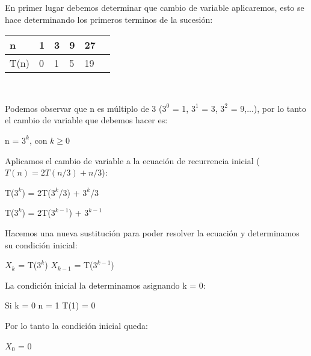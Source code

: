 \begin{solution}
  En primer lugar debemos determinar que cambio de variable aplicaremos, esto se hace determinando los primeros terminos de la sucesión:
  \begin{center}
    \begin{tabular}{@{}llllll@{}}
        \toprule
        n & 1 & 3 & 9 & 27 \\ \midrule
        T(n) & 0 & 1 & 5 & 19 \\ 
        \bottomrule
    \end{tabular}\\
  \end{center}
  
  Podemos observar que n es múltiplo de 3 ($3^0$ = 1, $3^1$ = 3, $3^2$ = 9,...), por lo tanto el cambio de variable que debemos hacer es:
  \begin{center}
      n = $3^k$, con $k \ge 0$
  \end{center}
  
  Aplicamos el cambio de variable a la ecuación de recurrencia inicial ($T(n) = 2T(n/3) + n/3$):
  
  \begin{center}
      T($3^k$) = 2T($3^k$/3) + $3^k$/3
      
      T($3^k$) = 2T($3^{k-1}$) + $3^{k-1}$
  \end{center}
  
  Hacemos una nueva sustitución para poder resolver la ecuación y determinamos su condición inicial:
  \begin{center}
      $X_k$ = T($3^k$) \implies $X_{k-1}$ = T($3^{k-1}$)
      
      La condición inicial la determinamos asignando k = 0:
      
      Si k = 0 \implies n = 1 \implies T(1) = 0
      
      Por lo tanto la condición inicial queda:
      
      $X_0$ = 0
      
  \end{center}
  
\end{solution}
